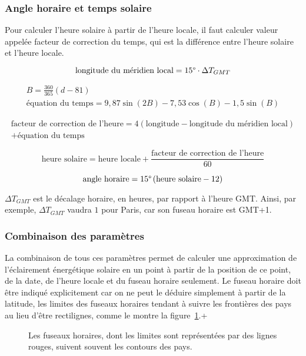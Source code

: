 \documentclass[12pt]{article}
\begin{document}
\subsubsection{Angle horaire et temps solaire} %


Pour calculer l'heure solaire à partir de l'heure locale, il faut calculer valeur appelée facteur de correction du temps, qui est la différence entre l'heure solaire et l'heure locale.


\[
	\text{longitude du méridien local} = 15 \degree \cdot \Delta T_{GMT}
\]

\begin{gather*}
	B = \frac{360}{365} \left( d - 81 \right) \\
	\text{équation du temps} = 9,87 \sin \left( 2B \right) - 7,53 \cos \left( B \right) - 1,5 \sin \left( B \right)
\end{gather*}

\begin{multline*}
	\text{facteur de correction de l'heure} = 4 \left( \text{longitude} - \text{longitude du méridien local} \right) \\ + \text{équation du temps}
\end{multline*}

\[
	\text{heure solaire} = \text{heure locale} + \frac{\text{facteur de correction de l'heure}}{60}
\]

\[
	\text{angle horaire} = 15 \degree \left(
		\text{heure solaire} - 12
	\right)
\]

$\Delta T_{GMT}$ est le décalage horaire, en heures, par rapport à l'heure GMT. Ainsi, par exemple, $\Delta T_{GMT}$ vaudra $1$ pour Paris, car son fuseau horaire est GMT+1.

\subsubsection{Combinaison des paramètres}
La combinaison de tous ces paramètres permet de calculer une approximation de l'éclairement énergétique solaire en un point à partir de la position de ce point, de la date, de l'heure locale et du fuseau horaire seulement.
Le fuseau horaire doit être indiqué explicitement car on ne peut le déduire simplement à partir de la latitude, les limites des fuseaux horaires tendant à suivre les frontières des pays au lieu d'être rectilignes, comme le montre la figure~\ref{fig:timezones}.+

\begin{figure}[!ht]
  \centering
  \caption{Les fuseaux horaires, dont les limites sont représentées par des lignes rouges, suivent souvent les contours des pays.}
  \label{fig:timezones}
\end{figure}
\end{document}
